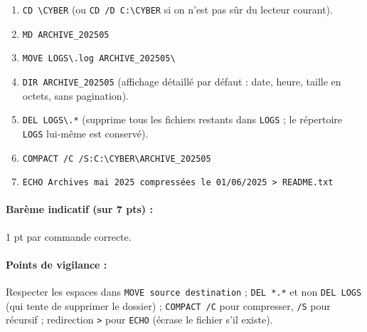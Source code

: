 \documentclass[11pt]{article}
\begin{document}
\begin{corrige}
\begin{enumerate}
    \item \texttt{CD \textbackslash CYBER} (ou \texttt{CD /D C:\textbackslash CYBER} si on n'est pas sûr du lecteur courant).
    \item \texttt{MD ARCHIVE\_202505}
    \item \texttt{MOVE LOGS\textbackslash *.log ARCHIVE\_202505\textbackslash}
    \item \texttt{DIR ARCHIVE\_202505} (affichage détaillé par défaut : date, heure, taille en octets, sans pagination).
    \item \texttt{DEL LOGS\textbackslash *.*} (supprime tous les fichiers restants dans \texttt{LOGS} ; le répertoire \texttt{LOGS} lui-même est conservé).
    \item \texttt{COMPACT /C /S:C:\textbackslash CYBER\textbackslash ARCHIVE\_202505}
    \item \texttt{ECHO Archives mai 2025 compressées le 01/06/2025 \textgreater{} README.txt}
\end{enumerate}
\paragraph{Barème indicatif (sur 7 pts) :} 1 pt par commande correcte.
\paragraph{Points de vigilance :} Respecter les espaces dans \texttt{MOVE source destination} ; \texttt{DEL *.*} et non \texttt{DEL LOGS} (qui tente de supprimer le dossier) ; \texttt{COMPACT /C} pour compresser, \texttt{/S} pour récursif ; redirection \texttt{\textgreater{}} pour \texttt{ECHO} (écrase le fichier s'il existe).
\end{corrige}
\end{document}
